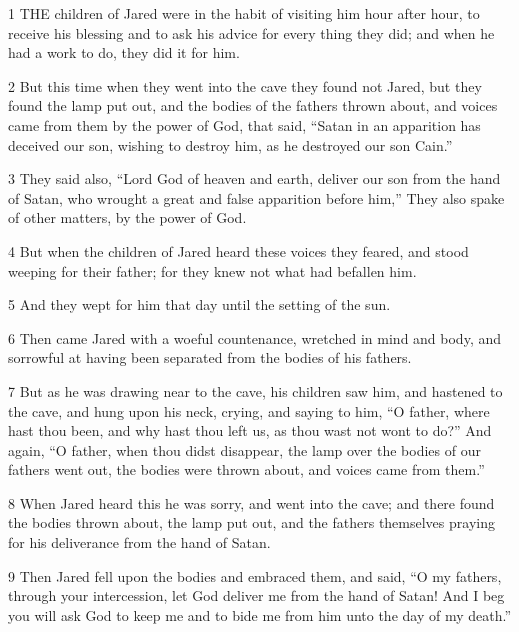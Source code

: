 \par 1 THE children of Jared were in the habit of visiting him hour after hour, to receive his blessing and to ask his advice for every thing they did; and when he had a work to do, they did it for him.

\par 2 But this time when they went into the cave they found not Jared, but they found the lamp put out, and the bodies of the fathers thrown about, and voices came from them by the power of God, that said, “Satan in an apparition has deceived our son, wishing to destroy him, as he destroyed our son Cain.”

\par 3 They said also, “Lord God of heaven and earth, deliver our son from the hand of Satan, who wrought a great and false apparition before him,” They also spake of other matters, by the power of God.

\par 4 But when the children of Jared heard these voices they feared, and stood weeping for their father; for they knew not what had befallen him.

\par 5 And they wept for him that day until the setting of the sun.

\par 6 Then came Jared with a woeful countenance, wretched in mind and body, and sorrowful at having been separated from the bodies of his fathers.

\par 7 But as he was drawing near to the cave, his children saw him, and hastened to the cave, and hung upon his neck, crying, and saying to him, “O father, where hast thou been, and why hast thou left us, as thou wast not wont to do?” And again, “O father, when thou didst disappear, the lamp over the bodies of our fathers went out, the bodies were thrown about, and voices came from them.”

\par 8 When Jared heard this he was sorry, and went into the cave; and there found the bodies thrown about, the lamp put out, and the fathers themselves praying for his deliverance from the hand of Satan.

\par 9 Then Jared fell upon the bodies and embraced them, and said, “O my fathers, through your intercession, let God deliver me from the hand of Satan! And I beg you will ask God to keep me and to bide me from him unto the day of my death.”

